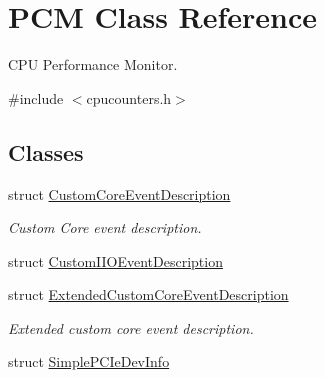 \hypertarget{class_p_c_m}{}\section{P\+CM Class Reference}
\label{class_p_c_m}


C\+PU Performance Monitor.  




{\ttfamily \#include $<$cpucounters.\+h$>$}

\subsection*{Classes}
\begin{DoxyCompactItemize}
\item 
struct \mbox{\hyperlink{struct_p_c_m_1_1_custom_core_event_description}{Custom\+Core\+Event\+Description}}
\begin{DoxyCompactList}\small\item\em Custom Core event description. \end{DoxyCompactList}\item 
struct \mbox{\hyperlink{struct_p_c_m_1_1_custom_i_i_o_event_description}{Custom\+I\+I\+O\+Event\+Description}}
\item 
struct \mbox{\hyperlink{struct_p_c_m_1_1_extended_custom_core_event_description}{Extended\+Custom\+Core\+Event\+Description}}
\begin{DoxyCompactList}\small\item\em Extended custom core event description. \end{DoxyCompactList}\item 
struct \mbox{\hyperlink{struct_p_c_m_1_1_simple_p_c_ie_dev_info}{Simple\+P\+C\+Ie\+Dev\+Info}}
\end{DoxyCompactItemize}
